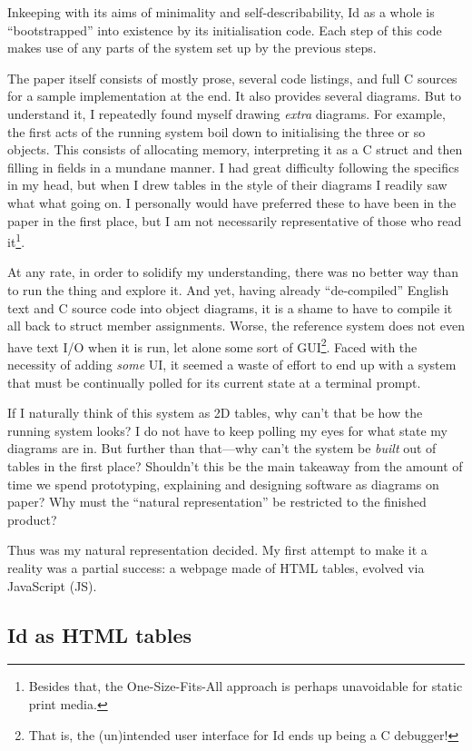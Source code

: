 Inkeeping with its aims of minimality and self-describability, Id as a
whole is ``bootstrapped'' into existence by its initialisation code.
Each step of this code makes use of any parts of the system set up by
the previous steps.

The paper itself consists of mostly prose, several code listings, and
full C sources for a sample implementation at the end. It also provides
several diagrams. But to understand it, I repeatedly found myself
drawing \emph{extra} diagrams. For example, the first acts of the
running system boil down to initialising the three or so objects. This
consists of allocating memory, interpreting it as a C struct and then
filling in fields in a mundane manner. I had great difficulty following
the specifics in my head, but when I drew tables in the style of their
diagrams I readily saw what what going on. I personally would have
preferred these to have been in the paper in the first place, but I am
not necessarily representative of those who read it\footnote{Besides
  that, the One-Size-Fits-All{} approach is perhaps unavoidable for
  static print media.}.

At any rate, in order to solidify my understanding, there was no better
way than to run the thing and explore it. And yet, having already
``de-compiled'' English text and C source code into object diagrams, it
is a shame to have to compile it all back to struct member assignments.
Worse, the reference system does not even have text I/O when it is run,
let alone some sort of GUI\footnote{That is, the (un)intended user
  interface for Id ends up being a C debugger!}. Faced with the
necessity of adding \emph{some} UI, it seemed a waste of effort to end
up with a system that must be continually polled for its current state
at a terminal prompt.

If I naturally think of this system as 2D tables, why can't that be how
the running system looks? I do not have to keep polling my eyes for what
state my diagrams are in. But further than that---why can't the system
be \emph{built} out of tables in the first place? Shouldn't this be the
main takeaway from the amount of time we spend prototyping, explaining
and designing software as diagrams on paper? Why must the ``natural
representation'' be restricted to the finished product?

Thus was my natural representation decided. My first attempt to make it
a reality was a partial success: a webpage made of HTML tables, evolved
via JavaScript (JS).

\hypertarget{as-html-tables}{%
\subsection{\texorpdfstring{Id{} as HTML
tables}{ as HTML tables}}\label{as-html-tables}}

